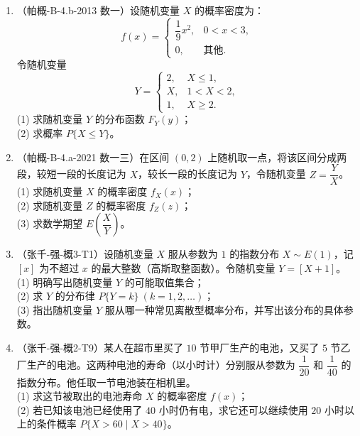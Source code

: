 \documentclass[12pt,a4paper]{ctexart}
\begin{document}
\begin{enumerate}[label=\arabic*.,resume]
\item（帕概-B-4.b-2013 数一）设随机变量 $X$ 的概率密度为：
\[
f(x) = \begin{cases} \dfrac{1}{9} x^{2}, & 0 < x < 3, \\ 0, & \text{其他}. \end{cases}
\]
令随机变量
\[
Y = \begin{cases} 2, & X \leqslant 1, \\ X, & 1 < X < 2, \\ 1, & X \geqslant 2. \end{cases}
\]
(1) 求随机变量 $Y$ 的分布函数 $F_{Y}(y)$；\\
(2) 求概率 $P\{X \leqslant Y\}$。

\item（帕概-B-4.a-2021 数一三）在区间 $(0, 2)$ 上随机取一点，将该区间分成两段，较短一段的长度记为 $X$，较长一段的长度记为 $Y$，令随机变量 $Z = \dfrac{Y}{X}$。\\
(1) 求随机变量 $X$ 的概率密度 $f_{X}(x)$；\\
(2) 求随机变量 $Z$ 的概率密度 $f_{Z}(z)$；\\
(3) 求数学期望 $E\left(\dfrac{X}{Y}\right)$。

\item（张千-强-概3-T1）设随机变量 $X$ 服从参数为 $1$ 的指数分布 $X \sim E(1)$，记 $[x]$ 为不超过 $x$ 的最大整数（高斯取整函数）。令随机变量 $Y = [X + 1]$。\\
(1) 明确写出随机变量 $Y$ 的可能取值集合；\\
(2) 求 $Y$ 的分布律 $P\{Y = k\}\ (k = 1, 2, \dots)$；\\
(3) 指出随机变量 $Y$ 服从哪一种常见离散型概率分布，并写出该分布的具体参数。

\item（张千-强-概2-T9）某人在超市里买了 $10$ 节甲厂生产的电池，又买了 $5$ 节乙厂生产的电池。这两种电池的寿命（以小时计）分别服从参数为 $\dfrac{1}{20}$ 和 $\dfrac{1}{40}$ 的指数分布。他任取一节电池装在相机里。\\
(1) 求这节被取出的电池寿命 $X$ 的概率密度 $f(x)$；\\
(2) 若已知该电池已经使用了 $40$ 小时仍有电，求它还可以继续使用 $20$ 小时以上的条件概率 $P\{X > 60 \mid X > 40\}$。

\end{enumerate}
\end{document}
